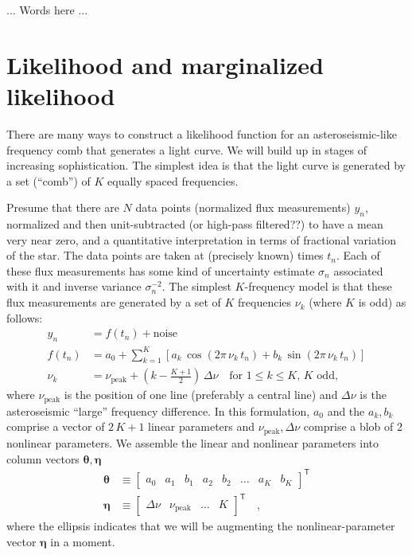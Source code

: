 \documentclass[modern]{aastex63}
\newcommand{\nupeak}{\nu_\mathrm{peak}}
\newcommand{\T}{^{\!\mathsf{T}\!}}
\renewcommand{\vector}[1]{\boldsymbol{#1}}
\newcommand{\veta}{\vector{\eta}}
\newcommand{\vtheta}{\vector{\theta}}
\begin{document}
... Words here ...

\section{Likelihood and marginalized likelihood}\label{sec:lhood}

There are many ways to construct a likelihood function for an
asteroseismic-like frequency comb that generates a light curve.
We will build up in stages of increasing sophistication.
The simplest idea is that the light curve is generated by a set (``comb'') of
$K$ equally spaced frequencies.

Presume that there are $N$ data points (normalized flux measurements)
$y_n$, normalized and then unit-subtracted (or high-pass filtered??)
to have a mean very near zero, and a quantitative interpretation in terms
of fractional variation of the star.
The data points are taken at (precisely known) times $t_n$.
Each of these flux measurements has some kind of uncertainty estimate
$\sigma_n$ associated with it and inverse variance $\sigma_n^{-2}$.
The simplest $K$-frequency model is that these flux measurements are
generated by a set of $K$ frequencies $\nu_k$ (where $K$ is odd) as follows:
\begin{align}
  y_n &= f(t_n) + \mbox{noise}
  \\
  f(t_n) &= a_0 + \sum_{k=1}^K \left[a_k\,\cos(2\pi\,\nu_k\,t_n) + b_k\,\sin(2\pi\,\nu_k\,t_n)\right]
  \\ \label{eq:nuk}
  \nu_k &= \nupeak + \left(k - \frac{K + 1}{2}\right)\,\Delta\nu
  \quad \mbox{for $1\leq k\leq K$, $K$ odd,}
\end{align}
where $\nupeak$ is the position of one line (preferably a central line)
and $\Delta\nu$ is the asteroseismic ``large'' frequency difference.
In this formulation, $a_0$ and the $a_k,b_k$ comprise a vector of
$2\,K+1$ linear parameters and $\nupeak, \Delta\nu$ comprise a
blob of 2 nonlinear parameters.
We assemble the linear and nonlinear parameters into column vectors $\vtheta,\veta$
\begin{align}
  \vtheta &\equiv \begin{bmatrix} a_0 & a_1 & b_1 & a_2 & b_2 & \hdots & a_K & b_K \end{bmatrix}\T
  \\
  \veta &\equiv \begin{bmatrix} \Delta\nu & \nupeak & \hdots & K \end{bmatrix}\T
  \quad ,
\end{align}
where the ellipsis indicates that we will be augmenting the
nonlinear-parameter vector $\veta$ in a moment.
\end{document}
